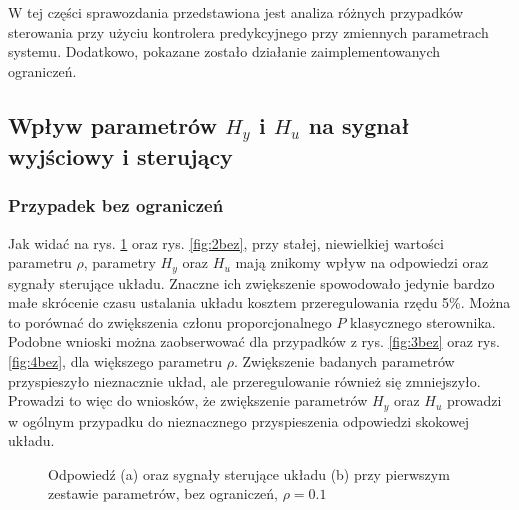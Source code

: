 \documentclass{article}
\begin{document}
W tej części sprawozdania przedstawiona jest analiza różnych przypadków sterowania przy użyciu kontrolera predykcyjnego przy zmiennych parametrach systemu. Dodatkowo, pokazane zostało działanie zaimplementowanych ograniczeń.

\subsection{Wpływ parametrów $H_y$ i $H_u$ na sygnał wyjściowy i sterujący}

\subsubsection{Przypadek bez ograniczeń}

Jak widać na rys. \ref{fig:1bez} oraz rys. \ref{fig:2bez}, przy stałej, niewielkiej wartości parametru $\rho$, parametry $H_y$ oraz $H_u$ mają znikomy wpływ na odpowiedzi oraz sygnały sterujące układu. Znaczne ich zwiększenie spowodowało jedynie bardzo małe skrócenie czasu ustalania układu kosztem przeregulowania rzędu 5\%. Można to porównać do zwiększenia członu proporcjonalnego $P$ klasycznego sterownika. Podobne wnioski można zaobserwować dla przypadków z rys. \ref{fig:3bez} oraz rys. \ref{fig:4bez}, dla większego parametru $\rho$. Zwiększenie badanych parametrów przyspieszyło nieznacznie układ, ale przeregulowanie również się zmniejszyło. Prowadzi to więc do wniosków, że zwiększenie parametrów $H_y$ oraz $H_u$ prowadzi w ogólnym przypadku do nieznacznego przyspieszenia odpowiedzi skokowej układu.

\begin{figure}[H]
    \centering
    \caption{Odpowiedź (a) oraz sygnały sterujące układu (b) przy pierwszym zestawie parametrów, bez ograniczeń, $\rho=0.1$}
    \label{fig:1bez}
\end{figure}
\end{document}
